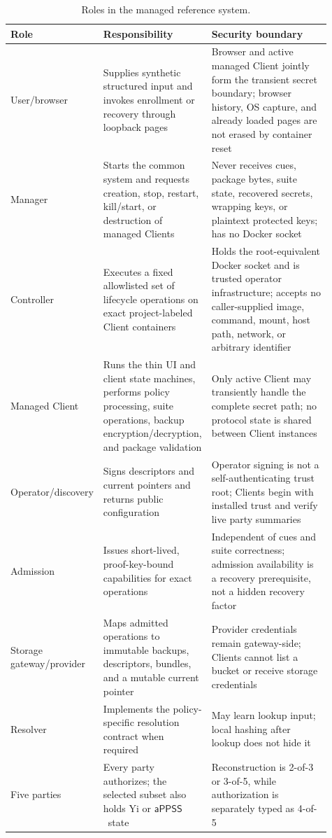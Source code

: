 \documentclass[sigconf,anonymous]{acmart}
\newcommand{\APPSS}{\ensuremath{\mathsf{aPPSS}}}
\begin{document}
\begin{table}[t]
\centering
\caption{Roles in the managed reference system.}
\label{tab:roles}
\footnotesize
\begin{tabular}{p{0.15\linewidth}p{0.31\linewidth}p{0.45\linewidth}}
\toprule
\textbf{Role} & \textbf{Responsibility} & \textbf{Security boundary} \\
\midrule
User/browser & Supplies synthetic structured input and invokes enrollment or
recovery through loopback pages & Browser and active managed Client jointly
form the transient secret boundary; browser history, OS capture, and already
loaded pages are not erased by container reset \\
\addlinespace
Manager & Starts the common system and requests creation, stop, restart,
kill/start, or destruction of managed Clients & Never receives cues, package
bytes, suite state, recovered secrets, wrapping keys, or plaintext protected
keys; has no Docker socket \\
\addlinespace
Controller & Executes a fixed allowlisted set of lifecycle operations on exact
project-labeled Client containers & Holds the root-equivalent Docker socket and
is trusted operator infrastructure; accepts no caller-supplied image, command,
mount, host path, network, or arbitrary identifier \\
\addlinespace
Managed Client & Runs the thin UI and client state machines, performs policy
processing, suite operations, backup encryption/decryption, and package
validation & Only active Client may transiently handle the complete secret
path; no protocol state is shared between Client instances \\
\addlinespace
Operator/discovery & Signs descriptors and current pointers and returns public
configuration & Operator signing is not a self-authenticating trust root;
Clients begin with installed trust and verify live party summaries \\
\addlinespace
Admission & Issues short-lived, proof-key-bound capabilities for exact
operations & Independent of cues and suite correctness; admission availability
is a recovery prerequisite, not a hidden recovery factor \\
\addlinespace
Storage gateway/provider & Maps admitted operations to immutable backups,
descriptors, bundles, and a mutable current pointer & Provider credentials
remain gateway-side; Clients cannot list a bucket or receive storage
credentials \\
\addlinespace
Resolver & Implements the policy-specific resolution contract when required &
May learn lookup input; local hashing after lookup does not hide it \\
\addlinespace
Five parties & Every party authorizes; the selected subset also holds Yi or
\APPSS\ state & Reconstruction is 2-of-3 or 3-of-5, while authorization is
separately typed as 4-of-5 \\
\bottomrule
\end{tabular}
\end{table}
\end{document}
